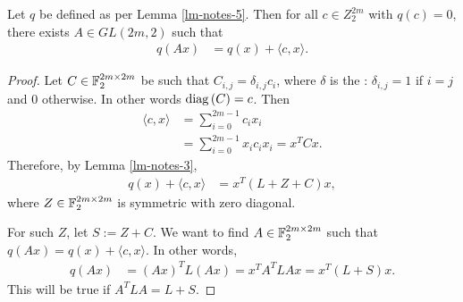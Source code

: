 \begin{Lemma}
\label{lm-notes-4}
Let $q$ be defined as per Lemma \ref{lm-notes-5}.
Then for all $c \in Z_2^{2 m}$ with $q(c)=0$, there exists $A \in GL(2 m, 2)$ such that
\begin{align*}
q(A x) &= q(x) + \langle c, x \rangle.
\end{align*}
\end{Lemma}

\begin{proof}
Let $C \in \mathbb{F}_2^{2 m \times 2 m}$ be such that $C_{i,j} = \delta_{i,j} c_i$, where $\delta$ is the
: $\delta_{i,j}=1$ if $i=j$ and $0$ otherwise.
In other words $\operatorname{diag}\left(C\right) = c$.
Then
\begin{align*}
\langle c, x \rangle
&=
\sum_{i=0}^{2m-1} c_i x_i
\\
&=
\sum_{i=0}^{2m-1} x_i c_i x_i
=
x^T C x.
\end{align*}
Therefore, by Lemma \ref{lm-notes-3},
\begin{align*}
q(x) + \langle c, x \rangle
&=
x^T (L + Z + C) x,
\end{align*}
where $Z \in \mathbb{F}_2^{2 m \times 2 m}$ is symmetric with zero diagonal.

For such $Z$, let $S := Z + C$.
We want to find $A \in \mathbb{F}_2^{2 m \times 2 m}$ such that $q(A x) = q(x) + \langle c, x \rangle.$
In other words,
\begin{align*}
q(A x)
&=
(A x)^T L (A x)
=
x^T A^T L A x
=
x^T (L + S) x.
\end{align*}
This will be true if $A^T L A = L + S.$


\end{proof}
